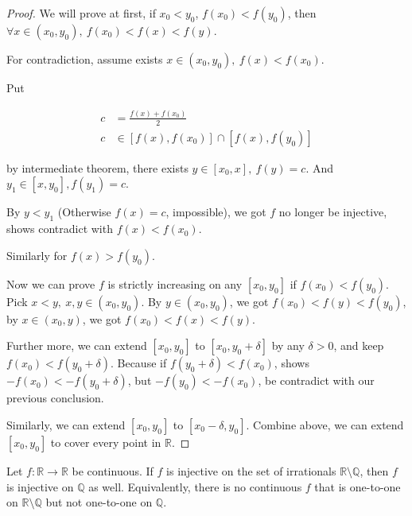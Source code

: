 \begin{proof}
    We will prove at first, if $x_0 < y_0$, $f(x_0) < f(y_0)$, then $\forall x \in (x_0, y_0),\: f(x_0) < f(x) < f(y)$.

    For contradiction, assume exists $x \in (x_0, y_0),\: f(x) < f(x_0)$.

    Put

    \begin{align*}
        c &= \frac{f(x) + f(x_0)}{2} \\
        c & \in [f(x), f(x_0)] \cap [f(x), f(y_0)] 
    \end{align*}

    by intermediate theorem, there exists $y \in [x_0, x],\: f(y) = c$.
    And $y_1 \in [x,y_0], f(y_1) = c$.

    By $y < y_1$ (Otherwise $f(x) = c$, impossible), we got $f$ no longer be injective, shows 
    contradict with $f(x) < f(x_0)$.

    Similarly for $f(x) > f(y_0)$.

    Now we can prove $f$ is strictly increasing on any $[x_0, y_0]$ if $f(x_0) < f(y_0)$. Pick $x <y,\: x,y \in (x_0, y_0)$. By $y \in (x_0, y_0)$,
    we got $f(x_0) < f(y) < f(y_0)$, by $x \in (x_0, y)$, we got $f(x_0) < f(x) < f(y)$.

    Further more, we can extend $[x_0, y_0]$ to $[x_0, y_0 + \delta]$ by any $\delta > 0$,
    and keep $f(x_0) < f(y_0 + \delta)$. Because if $f(y_0 + \delta) < f(x_0)$, 
    shows $-f(x_0) < - f(y_0 + \delta)$, but $-f(y_0) < -f(x_0)$, be contradict with our previous conclusion. 

    Similarly, we can extend $[x_0, y_0]$ to $[x_0 - \delta, y_0]$. Combine above, we can extend $[x_0, y_0]$
    to cover every point in $\mathbb{R}$.


\end{proof}

\begin{exercise}
Let $f:\mathbb{R}\to\mathbb{R}$ be continuous. If $f$ is injective on the set
of irrationals $\mathbb{R}\setminus\mathbb{Q}$, then $f$ is injective on $\mathbb{Q}$ as well.
Equivalently, there is no continuous $f$ that is one-to-one on $\mathbb{R}\setminus\mathbb{Q}$
but not one-to-one on $\mathbb{Q}$.
\end{exercise}

